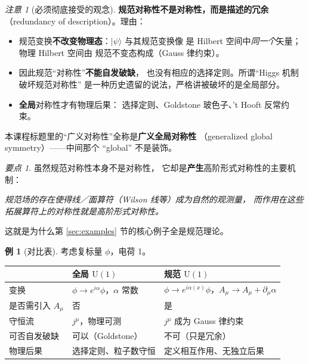 \documentclass[UTF8,a4paper,11pt]{ctexart}
\theoremstyle{plain}
\theoremstyle{definition}
\newtheorem{example}{例}[section]
\theoremstyle{remark}
\newtheorem{keypoint}{要点}[section]
\newtheorem{warning}{注意}[section]
\newcommand{\Uone}{\mathrm{U}(1)}
\newcommand{\en}[1]{\textsf{#1}}       %
\begin{document}
\begin{warning}[必须彻底接受的观念]
\label{warn:gauge}
\textbf{规范对称性不是对称性，而是描述的冗余}
（\en{redundancy of description}）。理由：
\begin{itemize}
  \item 规范变换\textbf{不改变物理态}：$|\psi\rangle$ 与其规范变换像
        是 Hilbert 空间中\emph{同一个}矢量；物理 Hilbert 空间由
        规范不变态构成（Gauss 律约束）。
  \item 因此规范“对称性”\textbf{不能自发破缺}，
        也没有相应的选择定则。所谓“Higgs 机制破坏规范对称性”
        是一种历史遗留的说法，严格讲被破坏的是全局部分。
  \item \textbf{全局}对称性才有物理后果：
        选择定则、Goldstone 玻色子、't Hooft 反常约束。
\end{itemize}
本课程标题里的“广义对称性”全称是\textbf{广义全局对称性}
（\en{generalized global symmetry}）——中间那个 “global” 不是装饰。
\end{warning}

\begin{keypoint}
\label{kp:gauge-produces}
虽然规范对称性本身不是对称性，
它却是\textbf{产生}高阶形式对称性的主要机制：
\begin{center}
\emph{规范场的存在使得线／面算符（Wilson 线等）成为自然的观测量，
而作用在这些拓展算符上的对称性就是高阶形式对称性。}
\end{center}
这就是为什么第 \ref{sec:examples} 节的核心例子全是规范理论。
\end{keypoint}

\begin{example}[对比表]
考虑复标量 $\phi$，电荷 1。
\begin{center}
\begin{tabular}{@{}lll@{}}
\toprule
 & 全局 $\Uone$ & 规范 $\Uone$ \\
\midrule
变换 & $\phi\to e^{i\alpha}\phi$，$\alpha$ 常数
     & $\phi\to e^{i\alpha(x)}\phi$，$A_\mu\to A_\mu+\partial_\mu\alpha$ \\
是否需引入 $A_\mu$ & 否 & 是 \\
守恒流 & $j^\mu$，物理可测 & $j^\mu$ 成为 Gauss 律约束 \\
可否自发破缺 & 可以（Goldstone） & 不可（只是冗余）\\
物理后果 & 选择定则、粒子数守恒 & 定义相互作用、无独立后果 \\
\bottomrule
\end{tabular}
\end{center}
\end{example}
\end{document}
